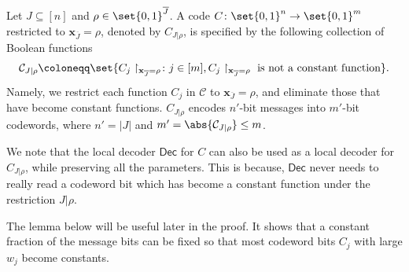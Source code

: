 \documentclass[10pt,a4paper]{article}
\theoremstyle{remark}
\def\*#1{\mathbf{#1}}
\def\+#1{\mathcal{#1}}
\newcommand{\Dec}{\ensuremath{\mathsf{Dec}}\xspace}
\begin{document}
Let $J \subseteq [n]$ and $\rho \in \set{0,1}^{\overline{J}}$. A code $C \colon \set{0,1}^n \rightarrow \set{0,1}^m$ restricted to $\*x_{\overline{J}} = \rho$, denoted by $C_{J|\rho}$, is specified by the following collection of Boolean functions
\begin{align*}
	\+C_{J|\rho} \coloneqq \set{C_j\restriction_{\*x_{\overline{J}}=\rho} \colon j \in [m], C_j\restriction_{\*x_{\overline{J}}=\rho}\textup{ is not a constant function}}.
\end{align*} 
Namely, we restrict each function $C_j$ in $\+C$ to $\*x_{\overline{J}}=\rho$, and eliminate those that have become constant functions. $C_{J|\rho}$ encodes $n'$-bit messages into $m'$-bit codewords, where $n'=|J|$ and $m' = \abs{\+C_{J|\rho}} \le m$. 

We note that the local decoder $\Dec$ for $C$ can also be used as a local decoder for $C_{J|\rho}$, while preserving all the parameters. This is because, $\Dec$ never needs to really read a codeword bit which has become a constant function under the restriction $J|\rho$. 

The lemma below will be useful later in the proof. It shows that a constant fraction of the message bits can be fixed so that most codeword bits $C_j$ with large $w_j$ become constants.
\end{document}
